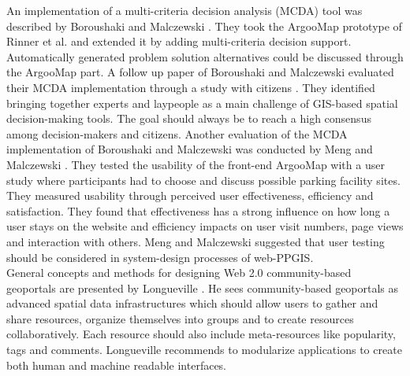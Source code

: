 An implementation of a multi-criteria decision analysis (MCDA) tool was described by Boroushaki and Malczewski \cite{Boroushaki2010_ParticipatoryGIS}. They took the ArgooMap prototype of Rinner et al. \cite{Rinner2009_Web2_argumap} and extended it by adding multi-criteria decision support. Automatically generated problem solution alternatives could be discussed through the ArgooMap part. A follow up paper of Boroushaki and Malczewski evaluated their MCDA implementation through a study with citizens \cite{Boroushaki2010_Consensus_measurement}. They identified bringing together experts and laypeople as a main challenge of GIS-based spatial decision-making tools. The goal should always be to reach a high consensus among decision-makers and citizens. Another evaluation of the MCDA implementation of Boroushaki and Malczewski was conducted by Meng and Malczewski \cite{Meng2010_ArgooMap_evaluation}. They tested the usability of the front-end ArgooMap with a user study where participants had to choose and discuss possible parking facility sites. They measured usability through perceived user effectiveness, efficiency and satisfaction. They found that effectiveness has a strong influence on how long a user stays on the website and efficiency impacts on user visit numbers, page views and interaction with others. Meng and Malczewski suggested that user testing should be considered in system-design processes of web-PPGIS.\\
General concepts and methods for designing Web 2.0 community-based geoportals are presented by Longueville \cite{Longueville2010_community_based_geoportals_web20}. He sees community-based geoportals as advanced spatial data infrastructures which should allow users to gather and share resources, organize themselves into groups and to create resources collaboratively. Each resource should also include meta-resources like popularity, tags and comments. Longueville recommends to modularize applications to create both human and machine readable interfaces.\\
